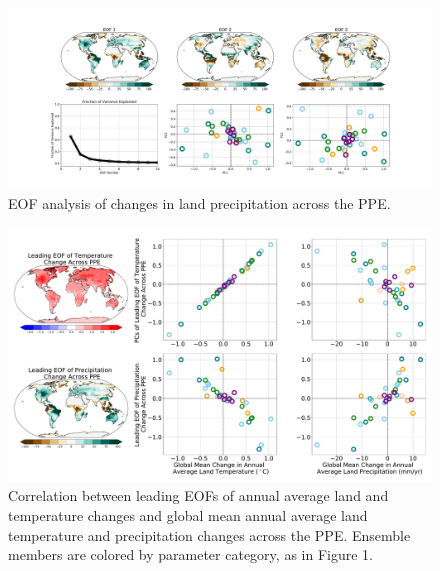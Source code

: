 \documentclass[draft, grl]{agujournal2019}
\begin{document}
\begin{figure}[htb!]
\noindent\includegraphics[width=\textwidth]{writing/figs/Figure_S_PRECT_EOF_summary.pdf}
\caption{EOF analysis of changes in land precipitation across the PPE.}
\label{fig:supp_EOF_analysis_Precip}
\end{figure}

\begin{figure}[htb!]
\noindent\includegraphics[width=\textwidth]{writing/figs/Figure_S_Correlation_between_EOFs_and_global_mean_changes.pdf}
\caption{Correlation between leading EOFs of annual average land and temperature changes and global mean annual average land temperature and precipitation changes across the PPE. Ensemble members are colored by parameter category, as in Figure 1.}
\label{fig:supp_EOF_globalmetric_correlation}
\end{figure}
\end{document}
